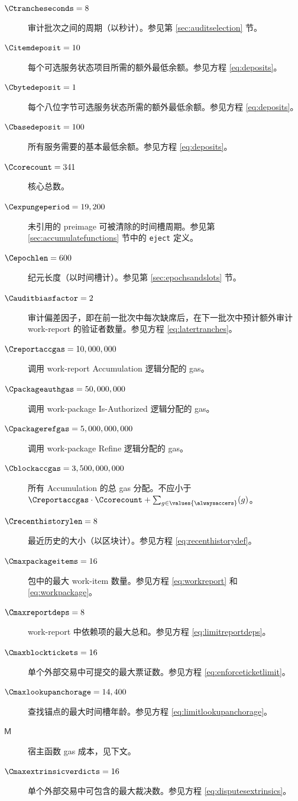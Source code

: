 \begin{description}
  \item[$\Ctrancheseconds = 8$] 审计批次之间的周期（以秒计）。参见第 \ref{sec:auditselection} 节。
  \item[$\Citemdeposit = 10$] 每个可选服务状态项目所需的额外最低余额。参见方程 \ref{eq:deposits}。
  \item[$\Cbytedeposit = 1$] 每个八位字节可选服务状态所需的额外最低余额。参见方程 \ref{eq:deposits}。
  \item[$\Cbasedeposit = 100$] 所有服务需要的基本最低余额。参见方程 \ref{eq:deposits}。
  \item[$\Ccorecount = 341$] 核心总数。
  \item[$\Cexpungeperiod = 19,200$] 未引用的 preimage 可被清除的时间槽周期。参见第 \ref{sec:accumulatefunctions} 节中的 \texttt{eject} 定义。
  \item[$\Cepochlen = 600$] 纪元长度（以时间槽计）。参见第 \ref{sec:epochsandslots} 节。
  \item[$\Cauditbiasfactor = 2$] 审计偏差因子，即在前一批次中每次缺席后，在下一批次中预计额外审计 work-report 的验证者数量。参见方程 \ref{eq:latertranches}。
  \item[$\Creportaccgas = 10,000,000$] 调用 work-report Accumulation 逻辑分配的 gas。
  \item[$\Cpackageauthgas = 50,000,000$] 调用 work-package Is-Authorized 逻辑分配的 gas。
  \item[$\Cpackagerefgas = 5,000,000,000$] 调用 work-package Refine 逻辑分配的 gas。
  \item[$\Cblockaccgas = 3,500,000,000$] 所有 Accumulation 的总 gas 分配。不应小于 $\Creportaccgas\cdot\Ccorecount + \sum_{g \in \values{\alwaysaccers}}(g)$。
  \item[$\Crecenthistorylen = 8$] 最近历史的大小（以区块计）。参见方程 \ref{eq:recenthistorydef}。
  \item[$\Cmaxpackageitems = 16$] 包中的最大 work-item 数量。参见方程 \ref{eq:workreport} 和 \ref{eq:workpackage}。
  \item[$\Cmaxreportdeps = 8$] work-report 中依赖项的最大总和。参见方程 \ref{eq:limitreportdeps}。
  \item[$\Cmaxblocktickets = 16$] 单个外部交易中可提交的最大票证数。参见方程 \ref{eq:enforceticketlimit}。
  \item[$\Cmaxlookupanchorage = 14,400$] 查找锚点的最大时间槽年龄。参见方程 \ref{eq:limitlookupanchorage}。
  \item[$\mathsf{M}$] 宿主函数 gas 成本，见下文。
  \item[$\Cmaxextrinsicverdicts = 16$] 单个外部交易中可包含的最大裁决数。参见方程 \ref{eq:disputesextrinsics}。

\end{description}

